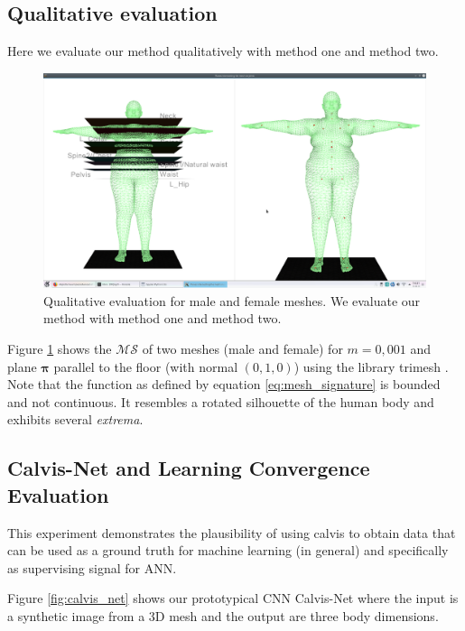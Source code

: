 \documentclass[runningheads, orivec]{llncs}
\begin{document}
\subsection{Qualitative evaluation}\label{subsec:qualitative_eval}
Here we evaluate our method qualitatively with method one and method two.
\begin{figure}[H]
	\begin{center}
		\includegraphics[width=\linewidth]{subject_6_with_cutting_planes_on_joints.eps}
	\end{center}
	\caption{Qualitative evaluation for male and female meshes. We evaluate our 
	method with method one and method two.}
	\label{fig:qualitative_eval}
\end{figure}

Figure \ref{fig:qualitative_eval} shows the $\mathcal{MS}$ of two meshes (male 
and female) for 
$m=0,001$ and plane $\boldsymbol{\pi}$ parallel to the floor (with normal $(0, 
1,0)$) using the library trimesh \cite{trimesh}. Note that the function as 
defined by equation \ref{eq:mesh_signature} is bounded and not continuous. It 
resembles a rotated silhouette of the human body and exhibits several 
\textit{extrema}.

\subsection{Calvis-Net and Learning Convergence 
Evaluation}\label{subsec:learn_conv}
This experiment demonstrates the plausibility of using calvis to obtain data 
that can be used as a ground truth for machine learning (in general) and 
specifically as supervising signal for ANN.

Figure \ref{fig:calvis_net} shows our prototypical CNN Calvis-Net where the 
input is a synthetic image from a 3D mesh and the output are three body 
dimensions.
\end{document}
